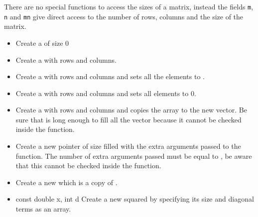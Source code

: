 There are no special functions to access the sizes of a matrix, instead the fields
\verb!m!, \verb!n! and \verb!mn! give direct access to the number of rows, columns
and the size of the matrix.

\begin{itemize}
  \item {}
  \sshortdescribe Create a  of size 0

\item {}
  \sshortdescribe Create a   with  rows and  columns.

\item {}
  \sshortdescribe Create a  with  rows and 
  columns and sets all the elements to .

\item {}
  \sshortdescribe Create a  with  rows and 
  columns and sets all elements to 0.

\item {}
  \sshortdescribe Create a  with  rows and 
  columns and copies the array  to the new vector. Be sure that 
  is long enough to fill all the vector because it cannot be checked inside the function.

\item {}
  \sshortdescribe Create a new  pointer of size  filled with the extra arguments passed to the function. The
  number of extra arguments passed must be equal to , be
  aware that this cannot be checked inside the function.

\item {}
  \sshortdescribe Create a new  which is a copy of .
  
\item {}
  {const double \ptr x, int d}
  \sshortdescribe Create a new squared  by specifying its size and
  diagonal terms as an array.


\end{itemize}
